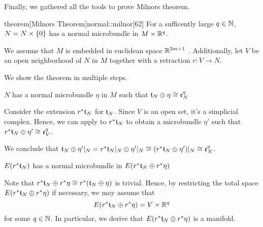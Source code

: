 \begin{scope}
    \newcommand{\rwhitney} {
        \whitney{\ind{r}\bt_N}{\ind{r}\eta}
    }
    \newcommand{\rtn} {
        \ind{r}\bt_N
    }

    \begin{myparagraph}
        Finally, we gathered all the tools to prove Milnors theorem.
    \end{myparagraph}

    \begin{mystatement}{theorem}[Milnors Theorem]{normal::milnor}[62]
        For a sufficently large $q \in \N$, $N = \cyldown{N}$ has a normal microbundle in $M \cross \R^q$.
    \end{mystatement}

    \begin{myproof}
        We assume that $M$ is embedded in euclidean space $\R^{2m + 1}$ \cite[p.60]{dimension}.
        Additionally, let $V$ be an open neighborhood of $N$ in $M$ together with a retraction $r: V \to N$.

        We show the theorem in multiple steps.
        \begin{steps}
            \item $N$ has a normal microbundle $\eta$ in $M$ such that $\whitney{\bt_N}{\eta} \cong \be[q]{N}$
            
            Consider the extension $\ind{r}\bt_N$ for $\bt_N$.
            Since $V$ is an open set, it's a simplicial complex.
            Hence, we can apply  to $\ind{r}\bt_N$
            to obtain a microbundle $\eta'$ such that $\whitney{\ind{r}\bt_N}{\eta'} \cong \be[q]{V}$.

            We conclude that $\whitney{\bt_N}{\eta'\restr{N}} = \whitney{\ind{r}\bt_N\restr{N}}{\eta'\restr{N}} \cong (\whitney{\ind{r}\bt_N}{\eta'})\restr{N} \cong \be[q]{N}$.

            \item $E(\rtn)$ has a normal microbundle in $E(\rwhitney)$

            Note that $\rwhitney \cong \ind{r}(\whitney{\bt_N}{\eta})$ is trivial.
            Hence, by restricting the total space $E(\rwhitney)$ if necessary,
            we may assume that
            \[ E(\rwhitney) = V \cross \R^q \]
            for some $q \in \N$.
            In particular, we derive that $E(\rwhitney)$ is a manifold.


\end{steps}
\end{myproof}
\end{scope}
